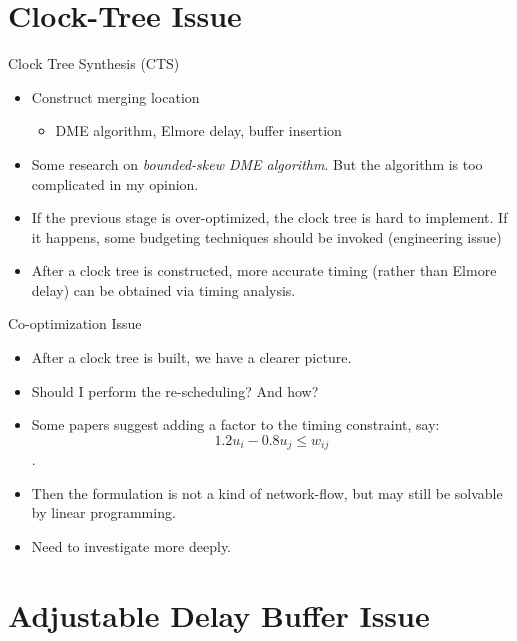 \documentclass[10pt,ignorenonframetext,mathserif]{beamer}
\providecommand{\tightlist}{%
  \setlength{\itemsep}{0pt}\setlength{\parskip}{0pt}}
\begin{document}
\section{Clock-Tree Issue}\label{clock-tree-issue}

\begin{frame}{Clock Tree Synthesis (CTS)}

\begin{itemize}
\tightlist
\item
  Construct merging location

  \begin{itemize}
  \tightlist
  \item
    DME algorithm, Elmore delay, buffer insertion
  \end{itemize}
\item
  Some research on \emph{bounded-skew DME algorithm}. But the algorithm
  is too complicated in my opinion.
\item
  If the previous stage is over-optimized, the clock tree is hard to
  implement. If it happens, some budgeting techniques should be invoked
  (engineering issue)
\item
  After a clock tree is constructed, more accurate timing (rather than
  Elmore delay) can be obtained via timing analysis.
\end{itemize}

\end{frame}

\begin{frame}{Co-optimization Issue}

\begin{itemize}
\tightlist
\item
  After a clock tree is built, we have a clearer picture.
\item
  Should I perform the re-scheduling? And how?
\item
  Some papers suggest adding a factor to the timing constraint, say:
  \[1.2 u_i - 0.8 u_j \leq w_{ij}\].
\item
  Then the formulation is not a kind of network-flow, but may still be
  solvable by linear programming.
\item
  Need to investigate more deeply.
\end{itemize}

\end{frame}

\section{Adjustable Delay Buffer
Issue}\label{adjustable-delay-buffer-issue}
\end{document}
